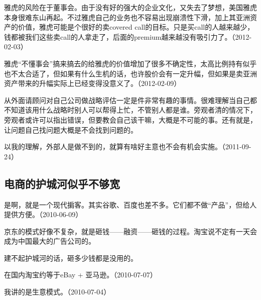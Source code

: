 雅虎的风险在于董事会。由于没有好的强大的企业文化，又失去了梦想，美国雅虎本身很难东山再起。不过雅虎自己的业务也不容易出现崩溃性下滑，加上其亚洲资产的价值，雅虎可能是个很好的卖covered call的目标。只是买call的人越来越少，钱都被我们这些卖call的人拿走了，后面的premium越来越没有吸引力了。（2012-02-03）

雅虎“不懂事会”搞来搞去的给雅虎的价值增加了很多不确定性，太高比例持有似乎也不太合适了，但如果有什么生机的话，也许股价会有一定升幅，但如果是卖亚洲资产带来的升幅实际上已经变得没意义了。（2012-02-09）


从外面请顾问对自己公司做战略评估一定是件非常有趣的事情。很难理解当自己都不知道该用什么战略时别人可以帮得上忙，不管别人都是谁。旁观者清的情况下，旁观者或许可以指出错误，但要教会自己该干嘛，大概是不可能的事。还有就是，让问题自己找问题大概是不会找到问题的。


以我的理解，外部人是做不到的，就算有啥好主意也不会有机会实施。（2011-09-24）

\subsection{电商的护城河似乎不够宽}


是啊，就是一个现代掮客。其实谷歌、百度也差不多。它们都不做“产品”，但给人提供方便。（2010-06-09）


京东的模式好像不复杂，就是砸钱——融资——砸钱的过程。淘宝说不定有一天会成为中国最大的广告公司的。


建不起护城河的话，砸多少钱都是没用的。


在国内淘宝约等于eBay + 亚马逊。（2010-07-07）

我讲的是生意模式。（2010-07-04）


